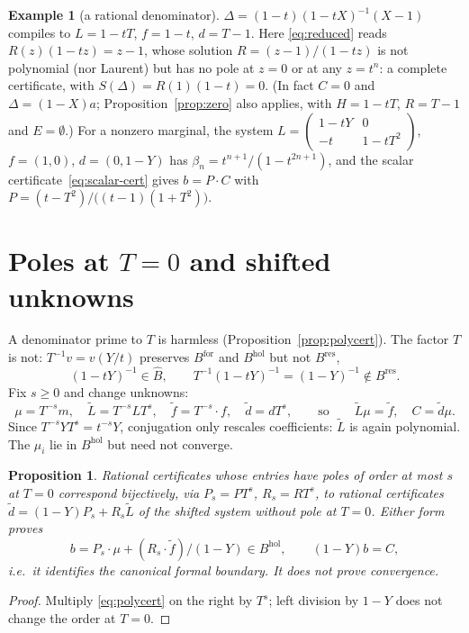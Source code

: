\documentclass[11pt,a4paper]{article}
\newcommand{\Bhat}{\widehat B}
\newcommand{\Bres}{B^{\mathrm{res}}}
\newcommand{\Bfor}{B^{\mathrm{for}}}
\newcommand{\Bhol}{B^{\mathrm{hol}}}
\newcommand{\Lt}{\widetilde L}
\newcommand{\dt}{\widetilde d}
\newcommand{\ft}{\widetilde f}
\theoremstyle{plain}
\newtheorem{proposition}[theorem]{Proposition}
\theoremstyle{definition}
\newtheorem{example}[theorem]{Example}
\theoremstyle{remark}
\begin{document}
\begin{example}[a rational denominator]\label{ex:incomplete}
$\Delta=(1-t)(1-tX)^{-1}(X-1)$ compiles to $L=1-tT$, $f=1-t$, $d=T-1$. Here
\eqref{eq:reduced} reads $R(z)(1-tz)=z-1$, whose solution $R=(z-1)/(1-tz)$ is
not polynomial (nor Laurent) but has no pole at $z=0$ or at any $z=t^n$: a
complete certificate, with $S(\Delta)=R(1)(1-t)=0$. (In fact $C=0$ and
$\Delta=(1-X)a$; Proposition~\ref{prop:zero} also applies, with $H=1-tT$,
$R=T-1$ and $E=\emptyset$.) For a nonzero marginal, the system
$L=\left(\begin{smallmatrix}1-tY&0\\-t&1-tT^2\end{smallmatrix}\right)$, $f=(1,0)$,
$d=(0,1-Y)$ has $\beta_n=t^{n+1}/(1-t^{2n+1})$, and the scalar
certificate~\eqref{eq:scalar-cert} gives $b=P\cdot C$ with
$P=(t-T^2)/\bigl((t-1)(1+T^2)\bigr)$.
\end{example}

\section{Poles at \texorpdfstring{$T=0$}{T=0} and shifted unknowns}\label{sec:laurent}

A denominator prime to $T$ is harmless (Proposition~\ref{prop:polycert}). The
factor $T$ is not: $T^{-1}v=v(Y/t)$ preserves $\Bfor$ and $\Bhol$ but not $\Bres$,
\[
  (1-tY)^{-1}\in\Bhat,\qquad T^{-1}(1-tY)^{-1}=(1-Y)^{-1}\notin\Bres.
\]
Fix $s\ge0$ and change unknowns:
\begin{equation}\label{eq:shift}
  \mu=T^{-s}m,\quad \Lt=T^{-s}LT^s,\quad \ft=T^{-s}\cdot f,\quad \dt=dT^s,
  \qquad\text{so}\qquad \Lt\mu=\ft,\quad C=\dt\mu.
\end{equation}
Since $T^{-s}YT^s=t^{-s}Y$, conjugation only rescales coefficients:
$\Lt$ is again polynomial. The $\mu_i$ lie in $\Bhol$ but need not converge.

\begin{proposition}\label{prop:laurent}
Rational certificates whose entries have poles of order at most $s$ at $T=0$
correspond bijectively, via $P_s=PT^s$, $R_s=RT^s$, to rational certificates
$\dt=(1-Y)P_s+R_s\Lt$ of the shifted system without pole at $T=0$. Either form
proves
\[
  b=P_s\cdot\mu+(R_s\cdot\ft)/(1-Y)\in\Bhol,\qquad (1-Y)b=C,
\]
i.e.\ it identifies the canonical formal boundary. It does \emph{not} prove
convergence.
\end{proposition}
\begin{proof}
Multiply \eqref{eq:polycert} on the right by $T^s$; left division by $1-Y$ does
not change the order at $T=0$.
\end{proof}
\end{document}
